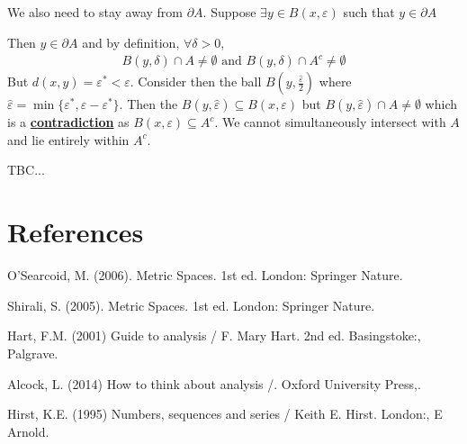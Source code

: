 \documentclass[10pt]{article}
\begin{document}
\begin{multicols}{2}
\begin{center}
\end{center}

\vspace*{13mm}

We also need to stay away from $\partial A$. Suppose $\exists y\in B(x,\varepsilon)$ such that $y\in\partial A$

Then $y\in\partial A$ and by definition, $\forall\delta>0$, 
\begin{align*}
    B(y,\delta)\cap A\neq\emptyset\text{ and }B(y,\delta)\cap A^{c}\neq\emptyset
\end{align*}
But $d(x,y)=\varepsilon^{*}<\varepsilon$. Consider then the ball $B(y,\frac{\hat{\varepsilon}}{2})$ where $\hat{\varepsilon}=\min\{\varepsilon^{*},\varepsilon-\varepsilon^{*}\}$. Then the $B(y,\hat{\varepsilon})\subseteq B(x,\varepsilon)$ but $B(y, \hat{\varepsilon})\cap A\neq\emptyset$ which is a \textbf{\underline{contradiction}} as $B(x,\varepsilon)\subseteq A^{c}$. We cannot simultaneously intersect with $A$ and lie entirely within $A^{c}$.
\end{multicols}



TBC...


\newpage
\section{References}
\begin{thebibliography}{1}
O'Searcoid, M. (2006). Metric Spaces. 1st ed. London: Springer Nature.

Shirali, S. (2005). Metric Spaces. 1st ed. London: Springer Nature.

Hart, F.M. (2001) Guide to analysis / F. Mary Hart. 2nd ed. Basingstoke:, Palgrave.

Alcock, L. (2014) How to think about analysis /. Oxford University Press,.

Hirst, K.E. (1995) Numbers, sequences and series / Keith E. Hirst. London:, E Arnold.

\end{thebibliography}
\end{document}
